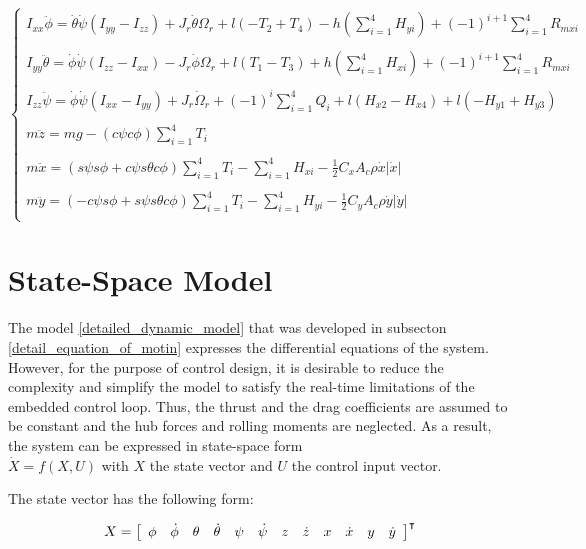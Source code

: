 \documentclass{thesisreport}
\begin{document}
\begin{equation}\label{detailed_dynamic_model}
\begin{cases}
I_{xx}\ddot{\phi} = \dot{\theta} \dot{\psi}(I_{yy}-I_{zz}) + J_r \dot{\theta}\Omega_r + l(-T_2+T_4)-h(\sum_{i=1}^4H_{yi})+(-1)^{i+1} \sum_{i=1}^4 R_{mxi}\\
\\
I_{yy}\ddot{\theta} = \dot{\phi} \dot{\psi}(I_{zz}-I_{xx}) - J_r \dot{\phi}\Omega_r + l(T_1-T_3) + h(\sum_{i=1}^4H_{xi})+(-1)^{i+1} \sum_{i=1}^4 R_{mxi}\\
\\
I_{zz}\ddot{\psi} = \dot{\phi} \dot{\psi}(I_{xx}-I_{yy}) + J_r \dot{\Omega}_r +(-1)^i \sum_{i=1}^4 Q_i + l(H_{x2}-H_{x4})+l(-H_{y1}+H_{y3})\\
\\
m\ddot{z} = mg -(c \psi c \phi)\sum_{i=1}^4T_i\\
\\
m\ddot{x} = (s \psi s \phi + c \psi s \theta c \phi) \sum_{i=1}^4 T_i - \sum_{i=1}^4 H_{xi}-\frac{1}{2}C_xA_c \rho \dot{x}|\dot{x}|\\
\\
m \ddot{y} = ( - c \psi s \phi + s \psi s \theta c \phi) \sum_{i=1}^4 T_i - \sum_{i=1}^4H_{yi} - \frac{1}{2}C_y A_c \rho \dot{y}|\dot{y}|\\
\end{cases}
\end{equation}

\newpage


 \section{State-Space Model}
The model \ref{detailed_dynamic_model} that was developed in subsecton \ref{detail_equation_of_motin} expresses the differential equations of the system. However, for the purpose of control design, it is desirable to reduce the complexity and simplify the model to satisfy the real-time limitations of the embedded control loop. Thus, the thrust and the drag coefficients are assumed to be constant and the hub forces and rolling moments are neglected. As a result, the system can be expressed in state-space form \\ $\dot{X}=f(X,U)$ with $X$ the state vector and $U$ the control input vector.

The state vector has the following form:

\begin{equation}\label{state_vector}
X = \left[\begin{array}{c c c c c c c c c c c c c}
\phi & \dot{\phi} & \theta & \dot{\theta} & \psi & \dot{\psi} & z & \dot{z} & x & \dot{x} & y & \dot{y} 
\end{array}\right]^{\intercal}
\end{equation}
  
\end{document}
